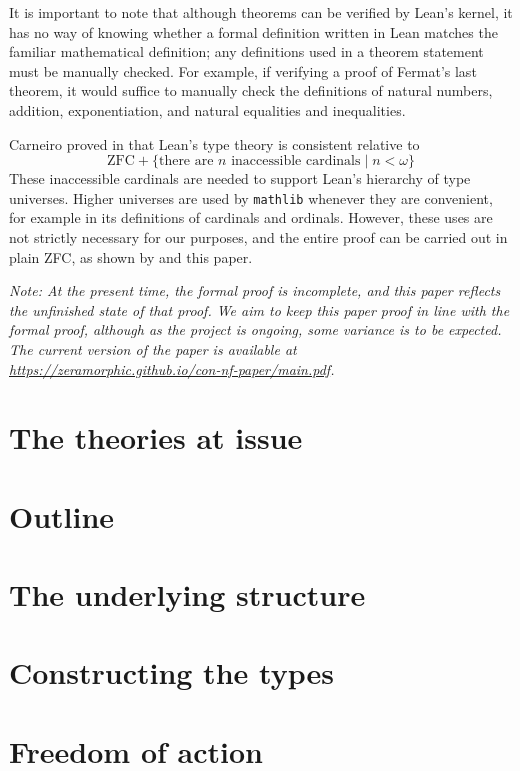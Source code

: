 \documentclass{article}
\theoremstyle{definition}
\theoremstyle{remark}
\begin{document}
It is important to note that although theorems can be verified by Lean's kernel, it has no way of knowing whether a formal definition written in Lean matches the familiar mathematical definition; any definitions used in a theorem statement must be manually checked.
For example, if verifying a proof of Fermat's last theorem, it would suffice to manually check the definitions of natural numbers, addition, exponentiation, and natural equalities and inequalities.

Carneiro proved in \cite{leantt} that Lean's type theory is consistent relative to
\[ \text{ZFC} + \{ \text{there are } n \text{ inaccessible cardinals} \mid n < \omega \} \]
These inaccessible cardinals are needed to support Lean's hierarchy of type universes.
Higher universes are used by \texttt{mathlib} whenever they are convenient, for example in its definitions of cardinals and ordinals.
However, these uses are not strictly necessary for our purposes, and the entire proof can be carried out in plain ZFC, as shown by \cite{holmes2023nf} and this paper.

\emph{%
	Note: At the present time, the formal proof \cite{leanprover-community-con-nf} is incomplete, and this paper reflects the unfinished state of that proof.
	We aim to keep this paper proof in line with the formal proof, although as the project is ongoing, some variance is to be expected.
	The current version of the paper is available at \url{https://zeramorphic.github.io/con-nf-paper/main.pdf}.
}

\section{The theories at issue}
\label{sec:theories}


\section{Outline}
\label{sec:outline}


\section{The underlying structure}
\label{sec:structure}


\section{Constructing the types}
\label{sec:construction}


\section{Freedom of action}
\label{sec:foa}


\printbibliography
\end{document}
